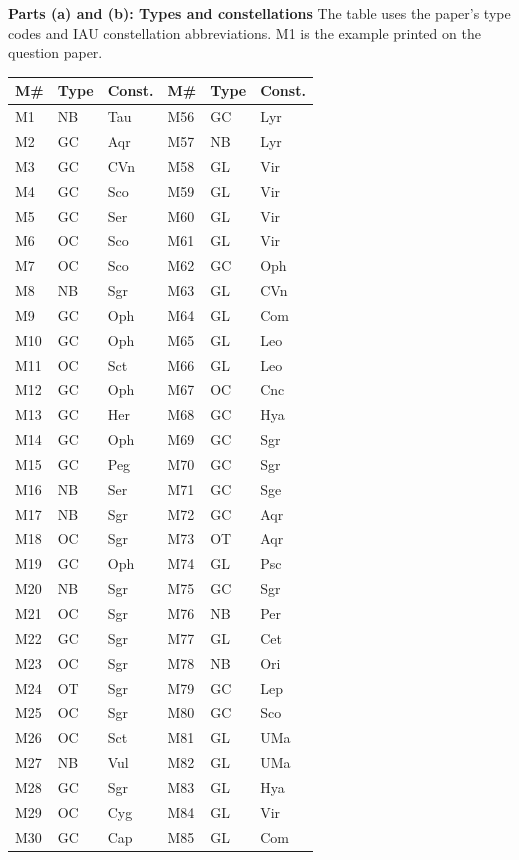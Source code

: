 \textbf{Parts (a) and (b): Types and constellations}
The table uses the paper's type codes and IAU constellation abbreviations. M1 is the example printed on the question paper.
\begin{longtable}{@{}lll@{\qquad}lll@{}}
\toprule
M\# & Type & Const. & M\# & Type & Const.\\
\midrule
\endhead
\bottomrule
\endfoot
M1 & NB & Tau & M56 & GC & Lyr\\
M2 & GC & Aqr & M57 & NB & Lyr\\
M3 & GC & CVn & M58 & GL & Vir\\
M4 & GC & Sco & M59 & GL & Vir\\
M5 & GC & Ser & M60 & GL & Vir\\
M6 & OC & Sco & M61 & GL & Vir\\
M7 & OC & Sco & M62 & GC & Oph\\
M8 & NB & Sgr & M63 & GL & CVn\\
M9 & GC & Oph & M64 & GL & Com\\
M10 & GC & Oph & M65 & GL & Leo\\
M11 & OC & Sct & M66 & GL & Leo\\
M12 & GC & Oph & M67 & OC & Cnc\\
M13 & GC & Her & M68 & GC & Hya\\
M14 & GC & Oph & M69 & GC & Sgr\\
M15 & GC & Peg & M70 & GC & Sgr\\
M16 & NB & Ser & M71 & GC & Sge\\
M17 & NB & Sgr & M72 & GC & Aqr\\
M18 & OC & Sgr & M73 & OT & Aqr\\
M19 & GC & Oph & M74 & GL & Psc\\
M20 & NB & Sgr & M75 & GC & Sgr\\
M21 & OC & Sgr & M76 & NB & Per\\
M22 & GC & Sgr & M77 & GL & Cet\\
M23 & OC & Sgr & M78 & NB & Ori\\
M24 & OT & Sgr & M79 & GC & Lep\\
M25 & OC & Sgr & M80 & GC & Sco\\
M26 & OC & Sct & M81 & GL & UMa\\
M27 & NB & Vul & M82 & GL & UMa\\
M28 & GC & Sgr & M83 & GL & Hya\\
M29 & OC & Cyg & M84 & GL & Vir\\
M30 & GC & Cap & M85 & GL & Com\\

\end{longtable}
